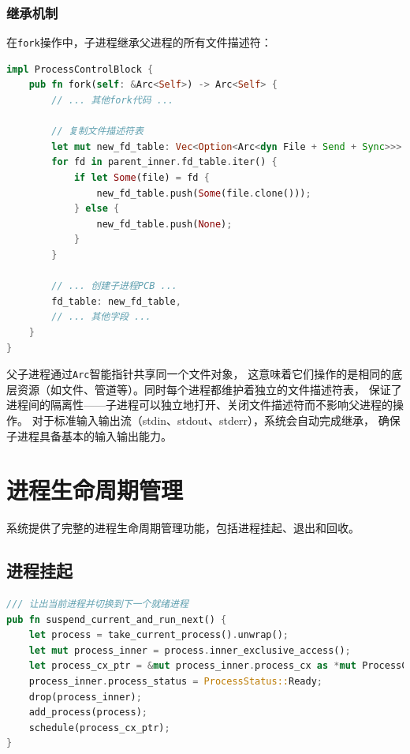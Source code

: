 \subsubsection{继承机制}

在\lstinline[language=Rust]{fork}操作中，子进程继承父进程的所有文件描述符：

\begin{lstlisting}[language=Rust,caption={文件描述符继承}, label={lst:fd-inheritance}]
impl ProcessControlBlock {
    pub fn fork(self: &Arc<Self>) -> Arc<Self> {
        // ... 其他fork代码 ...
        
        // 复制文件描述符表
        let mut new_fd_table: Vec<Option<Arc<dyn File + Send + Sync>>> = Vec::new();
        for fd in parent_inner.fd_table.iter() {
            if let Some(file) = fd {
                new_fd_table.push(Some(file.clone()));
            } else {
                new_fd_table.push(None);
            }
        }
        
        // ... 创建子进程PCB ...
        fd_table: new_fd_table,
        // ... 其他字段 ...
    }
}
\end{lstlisting}

父子进程通过\lstinline[language=Rust]{Arc}智能指针共享同一个文件对象，
这意味着它们操作的是相同的底层资源（如文件、管道等）。同时每个进程都维护着独立的文件描述符表，
保证了进程间的隔离性——子进程可以独立地打开、关闭文件描述符而不影响父进程的操作。
对于标准输入输出流（stdin、stdout、stderr），系统会自动完成继承，
确保子进程具备基本的输入输出能力。

\section{进程生命周期管理}

系统提供了完整的进程生命周期管理功能，包括进程挂起、退出和回收。

\subsection{进程挂起}

\begin{lstlisting}[language=Rust,caption={进程挂起实现}, label={lst:process-suspend}]
/// 让出当前进程并切换到下一个就绪进程
pub fn suspend_current_and_run_next() {
    let process = take_current_process().unwrap();
    let mut process_inner = process.inner_exclusive_access();
    let process_cx_ptr = &mut process_inner.process_cx as *mut ProcessContext;
    process_inner.process_status = ProcessStatus::Ready;
    drop(process_inner);
    add_process(process);
    schedule(process_cx_ptr);
}
\end{lstlisting}


